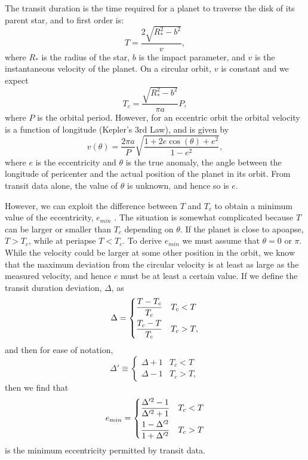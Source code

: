 The transit duration is the time required for a planet to traverse the
disk of its parent star, and to first order is:
\begin{equation}\label{eq:duration}
T = \frac{2 \sqrt{R_*^2 - b^2}}{v},
\end{equation}
where $R_*$ is the radius of the star, $b$ is the impact parameter,
and $v$ is the instantaneous velocity of the planet. On a circular
orbit, $v$ is constant and we expect
\begin{equation}\label{eq:durcirc}
T_c = \frac{\sqrt{R_*^2 - b^2}}{\pi a}P,
\end{equation}
where $P$ is the orbital period. However, for an eccentric orbit the
orbital velocity is a function of longitude (Kepler's 3rd Law), and is
given by
\begin{equation}\label{eq:velocity}
v(\theta) = \frac{2\pi a}{P}\sqrt{\frac{1 + 2e\cos(\theta) + e^2}{1-e^2}},
\end{equation}
where $e$ is the eccentricity and $\theta$ is the true anomaly, the
angle between the longitude of pericenter and the actual position of
the planet in its orbit. From transit data alone, the value of
$\theta$ is unknown, and hence so is $e$.

However, we can exploit the difference between $T$ and $T_c$ to obtain
a minimum value of the eccentricity, $e_{min}$ \citep{Barnes07}. The
situation is somewhat complicated because $T$ can be larger or smaller
than $T_c$ depending on $\theta$. If the planet is close to apoapse,
$T > T_c$, while at periapse $T < T_c$. To derive $e_{min}$ we must
assume that $\theta = 0$ or $\pi$. While the velocity could be larger
at some other position in the orbit, we know that the maximum
deviation from the circular velocity is at least as large as the
measured velocity, and hence $e$ must be at least a certain value. If
we define the transit duration deviation, $\Delta$, as
\begin{equation}\label{eq:tdd}
\Delta = \begin{dcases} \frac{T-T_c}{T_c} & T_c < T \\ \frac{T_c - T}{T_c} & T_c > T, \end{dcases}
\end{equation}
and then for ease of notation,
\begin{equation}\label{eq:deltaprime}
\Delta' \equiv \begin{cases} \Delta + 1 & T_c < T \\ \Delta - 1 & T_c > T, \end{cases}
\end{equation}
then we find that
\begin{equation}\label{eq:emin}
e_{min} = \begin{dcases} \frac{\Delta'^2 - 1}{\Delta'^2 + 1} & T_c < T \\ \frac{1 - \Delta'^2}{1 + \Delta'^2} & T_c > T \end{dcases}
\end{equation}
is the minimum eccentricity permitted by transit data.  


